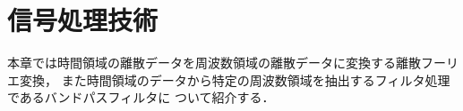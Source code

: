 \chapter{信号処理技術}


本章では時間領域の離散データを周波数領域の離散データに変換する離散フーリエ変換，
また時間領域のデータから特定の周波数領域を抽出するフィルタ処理であるバンドパスフィルタに
ついて紹介する．


% 


% 
% 
